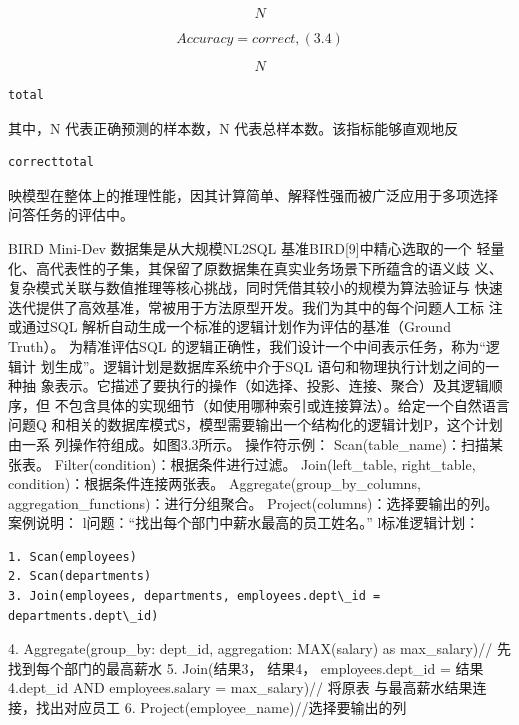\documentclass[12pt,a4paper,openright,UTF8]{ctexbook}
\begin{document}
\begin{equation*}
N
\end{equation*}

\begin{equation*}
Accuracy =correct,(3.4)
\end{equation*}

\begin{equation*}
N
\end{equation*}

\begin{lstlisting}
total
\end{lstlisting}
其中，N 代表正确预测的样本数，N 代表总样本数。该指标能够直观地反

\begin{lstlisting}
correcttotal
\end{lstlisting}
映模型在整体上的推理性能，因其计算简单、解释性强而被广泛应用于多项选择 问答任务的评估中。

BIRD Mini-Dev 数据集是从大规模NL2SQL 基准BIRD[9]中精心选取的一个 轻量化、高代表性的子集，其保留了原数据集在真实业务场景下所蕴含的语义歧 义、复杂模式关联与数值推理等核心挑战，同时凭借其较小的规模为算法验证与 快速迭代提供了高效基准，常被用于方法原型开发。我们为其中的每个问题人工标 注或通过SQL 解析自动生成一个标准的逻辑计划作为评估的基准（Ground Truth）。 为精准评估SQL 的逻辑正确性，我们设计一个中间表示任务，称为“逻辑计 划生成”。逻辑计划是数据库系统中介于SQL 语句和物理执行计划之间的一种抽 象表示。它描述了要执行的操作（如选择、投影、连接、聚合）及其逻辑顺序，但 不包含具体的实现细节（如使用哪种索引或连接算法）。给定一个自然语言问题Q 和相关的数据库模式S，模型需要输出一个结构化的逻辑计划P，这个计划由一系 列操作符组成。如图3.3所示。 操作符示例： Scan(table\_name)：扫描某张表。 Filter(condition)：根据条件进行过滤。 Join(left\_table, right\_table, condition)：根据条件连接两张表。 Aggregate(group\_by\_columns, aggregation\_functions)：进行分组聚合。 Project(columns)：选择要输出的列。 案例说明： l问题：“找出每个部门中薪水最高的员工姓名。” l标准逻辑计划：

\begin{lstlisting}
1. Scan(employees)
2. Scan(departments)
3. Join(employees, departments, employees.dept\_id = departments.dept\_id)
\end{lstlisting}
4. Aggregate(group\_by: dept\_id, aggregation: MAX(salary) as max\_salary)// 先找到每个部门的最高薪水 5. Join(结果3， 结果4， employees.dept\_id = 结果4.dept\_id AND employees.salary = max\_salary)// 将原表 与最高薪水结果连接，找出对应员工 6. Project(employee\_name)//选择要输出的列
\end{document}
